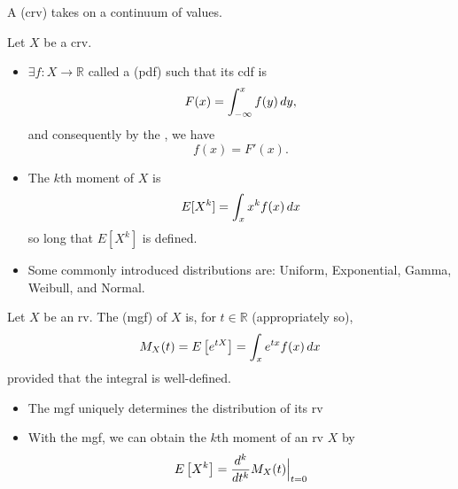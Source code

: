 \documentclass[notoc,notitlepage]{tufte-book}
\begin{document}
\begin{defn}\label{defn:continuous_random_variable}
  A  (crv) takes on a continuum of values.
\end{defn}

\begin{note}
  Let $X$ be a crv.
  \begin{itemize}
    \item $\exists f : X \to \mathbb{R}$ called a  (pdf) such that its cdf is
      \begin{equation*}
        F(x) = \int_{-\infty}^{x} f(y) \mathop{}\!d{y},
      \end{equation*}
      and consequently by the , we have
      \begin{equation*}
        f(x) = F'(x).
      \end{equation*}

    \item The $k$th moment of $X$ is
      \begin{equation*}
        E[X^k] = \int_{x} x^k f(x) \mathop{}\!d{x} 
      \end{equation*}
      so long that $E[X^k]$ is defined.
      
    \item Some commonly introduced distributions are: Uniform, Exponential, Gamma, Weibull, and Normal.
  \end{itemize}
\end{note}

\begin{defn}\label{defn:moment_generating_function}
Let $X$ be an rv. The  (mgf) of $X$ is, for $t \in \mathbb{R}$ (appropriately so),
  \begin{equation*}
    M_X(t) = E\left[e^{tX}\right] = \int_{x} e^{tx} f(x) \mathop{}\!d{x}
  \end{equation*}
  provided that the integral is well-defined.
\end{defn}

\begin{note}
  \begin{itemize}
    \item The mgf uniquely determines the distribution of its rv

    \item With the mgf, we can obtain the $k$th moment of an rv $X$ by
      \begin{equation*}
        E\left[X^k\right] = \frac{d^k}{dt^k} M_X(t) \Big|_{t = 0}^{}
      \end{equation*}
  \end{itemize}
\end{note}
\end{document}
